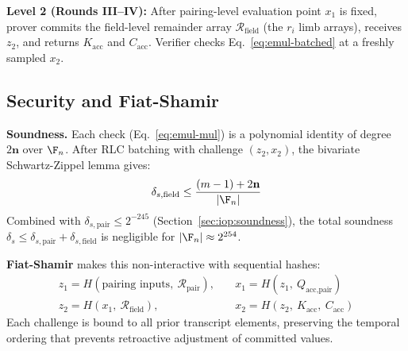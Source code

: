 \textbf{Level 2 (Rounds III--IV):} After pairing-level evaluation point $x_1$ is fixed, prover commits the field-level remainder array $\mathcal{R}_\text{field}$ (the $r_i$ limb arrays), receives $z_2$, and returns $K_{\text{acc}}$ and $C_{\text{acc}}$. Verifier checks Eq.~\ref{eq:emul-batched} at a freshly sampled $x_2$.


\subsection{Security and Fiat-Shamir}

\textbf{Soundness.} Each check (Eq.~\ref{eq:emul-mul}) is a polynomial identity of degree $2\mathbf{n}$ over $\F_n$. After RLC batching with challenge $(z_2, x_2)$, the bivariate Schwartz-Zippel lemma gives:
$$\delta_{s,\text{field}} \leq \frac{(m-1) + 2\mathbf{n}}{|\F_n|}$$
Combined with $\delta_{s,\text{pair}} \leq 2^{-245}$ (Section~\ref{sec:iop:soundness}), the total soundness $\delta_s \leq \delta_{s,\text{pair}} + \delta_{s,\text{field}}$ is negligible for $|\F_n| \approx 2^{254}$.

\textbf{Fiat-Shamir} makes this non-interactive with sequential hashes:
\begin{align*}
z_1 = H(\text{pairing inputs},\ \mathcal{R}_\text{pair}), \quad &
x_1 = H(z_1,\ Q_{\text{acc,pair}}) \\
z_2 = H(x_1,\ \mathcal{R}_\text{field}), \quad &
x_2 = H(z_2,\ K_{\text{acc}},\ C_{\text{acc}})
\end{align*}
Each challenge is bound to all prior transcript elements, preserving the temporal ordering that prevents retroactive adjustment of committed values.
